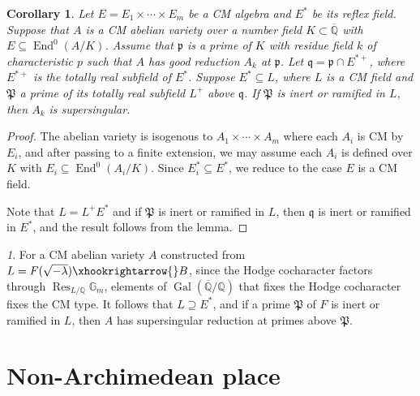 \documentclass{amsart}
\numberwithin{equation}{subsection}
\numberwithin{theorem}{section}
\newtheorem{corollary}[theorem]{Corollary}
\theoremstyle{definition}
\theoremstyle{remark}
\newtheorem{para}[theorem]{}
\newcommand{\bQ}{\mathbb{Q}}
\DeclareMathOperator{\Gal}{Gal}
\DeclareMathOperator{\End}{End}
\DeclareMathOperator{\Res}{Res}
\begin{document}
\begin{corollary}
    Let $E = E_1\times \cdots \times E_m$ be a CM algebra and $E^*$ be its reflex field. Suppose that $A$ is a CM abelian variety over a number field $K \subset \overline{\bQ}$ with $E \subseteq \End^0(A/K)$.  Assume that $\mathfrak{p}$ is a prime of $K$ with residue field $k$ of characteristic $p$ such that $A$ has good reduction $A_k$ at $\mathfrak{p}$. Let $\mathfrak{q} = \mathfrak{p} \cap E^{*+}$, where $E^{*+}$ is the totally real subfield of $E^*$. Suppose $E^* \subseteq L$, where $L$ is a CM field and $\mathfrak{P}$ a prime of its totally real subfield $L^+$ above $\mathfrak{q}$. If $\mathfrak{P}$ is inert or ramified in $L$, then $A_k$ is supersingular. 
\end{corollary}
\begin{proof}
    The abelian variety is isogenous to $A_1\times \cdots \times A_m$ where each $A_i$ is CM by $E_i$, and after passing to a finite extension, we may assume each $A_i$ is defined over $K$ with $E_i \subseteq \End^0(A_i/K)$. Since $E_i^* \subseteq E^*$, we reduce to the case $E$ is a CM field. 

    Note that $L = L^+ E^*$ and if $\mathfrak{P}$ is inert or ramified in $L$, then $\mathfrak{q}$ is inert or ramified in $E^*$,  
    and the result follows from the lemma. 
\end{proof}

\begin{para} \label{supersingular}
    For a CM abelian variety $A$ constructed from $L = F(\sqrt{-\lambda})\xhookrightarrow{} B$, since the Hodge cocharacter factors through $\Res_{L/\bQ}\mathbb{G}_m$, elements of $\Gal(\overline{\bQ}/\bQ)$ that fixes the Hodge cocharacter fixes the CM type. It follows that $L\supseteq E^*$, and if a prime $\mathfrak{P}$ of $F$ is inert or ramified in $L$, then $A$ has supersingular reduction at primes above $\mathfrak{P}$.
\end{para}


\section{Non-Archimedean place} \label{sec:nonarch}
\end{document}
